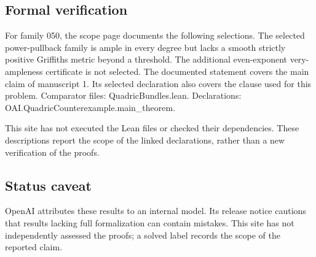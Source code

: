 \documentclass[11pt]{article}
\begin{document}
\subsection{Formal verification}
For family 050, the scope page documents the following selections. The selected power-pullback family is ample in every degree but lacks a smooth strictly positive Griffiths metric beyond a threshold. The additional even-exponent very-ampleness certificate is not selected. The documented statement covers the main claim of manuscript 1. Its selected declaration also covers the clause used for this problem. Comparator files: QuadricBundles.lean. Declarations: OAI.QuadricCounterexample.main\_theorem.

This site has not executed the Lean files or checked their dependencies. These descriptions report the scope of the linked declarations, rather than a new verification of the proofs.

\subsection{Status caveat}
OpenAI attributes these results to an internal model. Its release notice cautions that results lacking full formalization can contain mistakes. This site has not independently assessed the proofs; a solved label records the scope of the reported claim.
\end{document}
